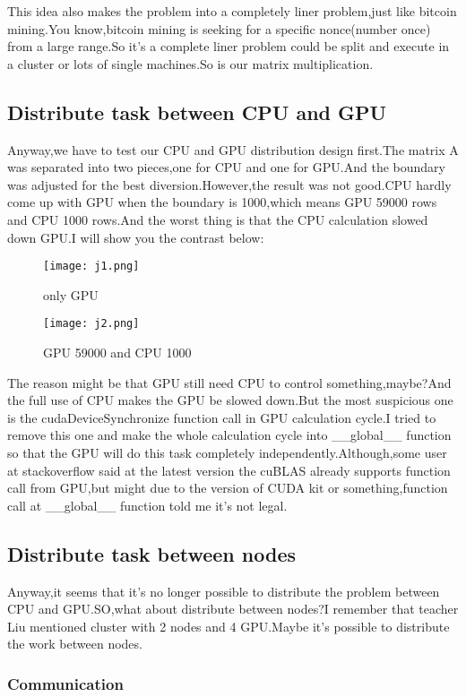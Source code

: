 \documentclass[12pt]{scrartcl} %
\begin{document}
This idea also makes the problem into a completely liner problem,just like bitcoin mining.You know,bitcoin mining is seeking for a specific nonce(number once) from a large range.So it's a complete liner problem could be split and execute in a cluster or lots of single machines.So is our matrix multiplication.
\subsection{Distribute task between CPU and GPU}
Anyway,we have to test our CPU and GPU distribution design first.The matrix A was separated into two pieces,one for CPU and one for GPU.And the boundary was adjusted for the best diversion.However,the result was not good.CPU hardly come up with GPU when the boundary is 1000,which means GPU 59000 rows and CPU 1000 rows.And the worst thing is that the CPU calculation slowed down GPU.I will show you the contrast below:
\begin{figure}[H]
    \centering
    \texttt{[image: j1.png]}
    \caption{only GPU}
    \label{}
\end{figure}
\begin{figure}[H]
    \centering
    \texttt{[image: j2.png]}
    \caption{GPU 59000 and CPU 1000}
    \label{}
\end{figure}

The reason might be that GPU still need CPU to control something,maybe?And the full use of CPU makes the GPU be slowed down.But the most suspicious one is the cudaDeviceSynchronize function call in GPU calculation cycle.I tried to remove this one and make the whole calculation cycle into \_\_global\_\_ function so that the GPU will do this task completely independently.Although,some user at stackoverflow said at the latest version the cuBLAS already supports function call from GPU,but might due to the version of CUDA kit or something,function call at \_\_global\_\_ function told me it's not legal.
\subsection{Distribute task between nodes}
Anyway,it seems that it's no longer possible to distribute the problem between CPU and GPU.SO,what about distribute between nodes?I remember that teacher Liu mentioned cluster with 2 nodes and 4 GPU.Maybe it's possible to distribute the work between nodes.
\subsubsection{Communication}
\end{document}
